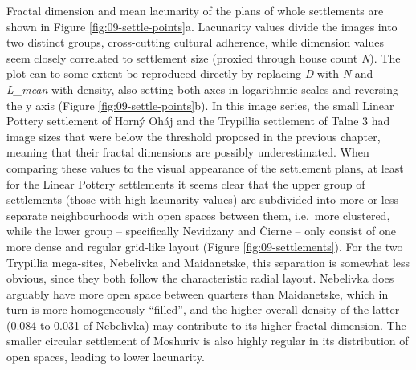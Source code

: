 \documentclass[
  12pt,
]{book}
\begin{document}
Fractal dimension and mean lacunarity of the plans of whole settlements are shown in Figure \ref{fig:09-settle-points}a. Lacunarity values divide the images into two distinct groups, cross-cutting cultural adherence, while dimension values seem closely correlated to settlement size (proxied through house count \emph{N}). The plot can to some extent be reproduced directly by replacing \emph{D} with \emph{N} and \emph{L\_mean} with density, also setting both axes in logarithmic scales and reversing the y axis (Figure \ref{fig:09-settle-points}b). In this image series, the small Linear Pottery settlement of Horný Oháj and the Trypillia settlement of Talne 3 had image sizes that were below the threshold proposed in the previous chapter, meaning that their fractal dimensions are possibly underestimated. When comparing these values to the visual appearance of the settlement plans, at least for the Linear Pottery settlements it seems clear that the upper group of settlements (those with high lacunarity values) are subdivided into more or less separate neighbourhoods with open spaces between them, i.e.~more clustered, while the lower group -- specifically Nevidzany and Čierne -- only consist of one more dense and regular grid-like layout (Figure \ref{fig:09-settlements}). For the two Trypillia mega-sites, Nebelivka and Maidanetske, this separation is somewhat less obvious, since they both follow the characteristic radial layout. Nebelivka does arguably have more open space between quarters than Maidanetske, which in turn is more homogeneously ``filled'', and the higher overall density of the latter (0.084 to 0.031 of Nebelivka) may contribute to its higher fractal dimension. The smaller circular settlement of Moshuriv is also highly regular in its distribution of open spaces, leading to lower lacunarity.
\end{document}
